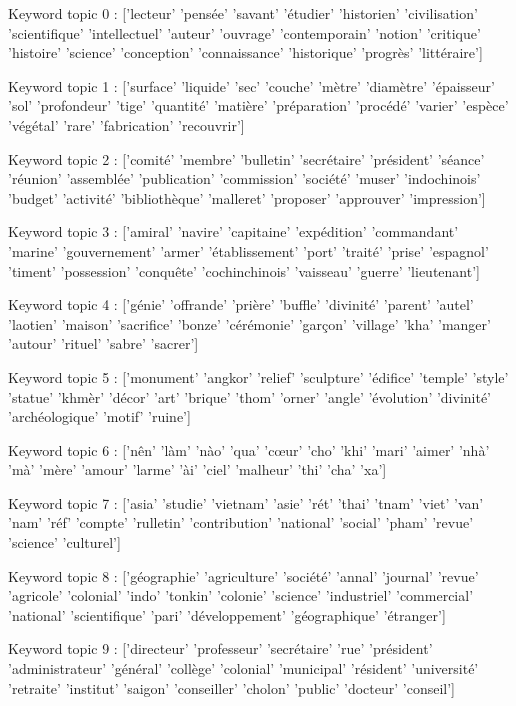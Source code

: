 Keyword topic 0 : ['lecteur' 'pensée' 'savant' 'étudier' 'historien' 'civilisation'
 'scientifique' 'intellectuel' 'auteur' 'ouvrage' 'contemporain' 'notion'
 'critique' 'histoire' 'science' 'conception' 'connaissance' 'historique'
 'progrès' 'littéraire']

Keyword topic 1 : ['surface' 'liquide' 'sec' 'couche' 'mètre' 'diamètre' 'épaisseur' 'sol'
 'profondeur' 'tige' 'quantité' 'matière' 'préparation' 'procédé' 'varier'
 'espèce' 'végétal' 'rare' 'fabrication' 'recouvrir']

Keyword topic 2 : ['comité' 'membre' 'bulletin' 'secrétaire' 'président' 'séance' 'réunion'
 'assemblée' 'publication' 'commission' 'société' 'muser' 'indochinois'
 'budget' 'activité' 'bibliothèque' 'malleret' 'proposer' 'approuver'
 'impression']

Keyword topic 3 : ['amiral' 'navire' 'capitaine' 'expédition' 'commandant' 'marine'
 'gouvernement' 'armer' 'établissement' 'port' 'traité' 'prise' 'espagnol'
 'timent' 'possession' 'conquête' 'cochinchinois' 'vaisseau' 'guerre'
 'lieutenant']

Keyword topic 4 : ['génie' 'offrande' 'prière' 'buffle' 'divinité' 'parent' 'autel'
 'laotien' 'maison' 'sacrifice' 'bonze' 'cérémonie' 'garçon' 'village'
 'kha' 'manger' 'autour' 'rituel' 'sabre' 'sacrer']

Keyword topic 5 : ['monument' 'angkor' 'relief' 'sculpture' 'édifice' 'temple' 'style'
 'statue' 'khmèr' 'décor' 'art' 'brique' 'thom' 'orner' 'angle'
 'évolution' 'divinité' 'archéologique' 'motif' 'ruine']

Keyword topic 6 : ['nên' 'làm' 'nào' 'qua' 'cœur' 'cho' 'khi' 'mari' 'aimer' 'nhà' 'mà'
 'mère' 'amour' 'larme' 'ài' 'ciel' 'malheur' 'thi' 'cha' 'xa']

Keyword topic 7 : ['asia' 'studie' 'vietnam' 'asie' 'rét' 'thai' 'tnam' 'viet' 'van' 'nam'
 'réf' 'compte' 'rulletin' 'contribution' 'national' 'social' 'pham'
 'revue' 'science' 'culturel']

Keyword topic 8 : ['géographie' 'agriculture' 'société' 'annal' 'journal' 'revue' 'agricole'
 'colonial' 'indo' 'tonkin' 'colonie' 'science' 'industriel' 'commercial'
 'national' 'scientifique' 'pari' 'développement' 'géographique'
 'étranger']

Keyword topic 9 : ['directeur' 'professeur' 'secrétaire' 'rue' 'président' 'administrateur'
 'général' 'collège' 'colonial' 'municipal' 'résident' 'université'
 'retraite' 'institut' 'saigon' 'conseiller' 'cholon' 'public' 'docteur'
 'conseil']


